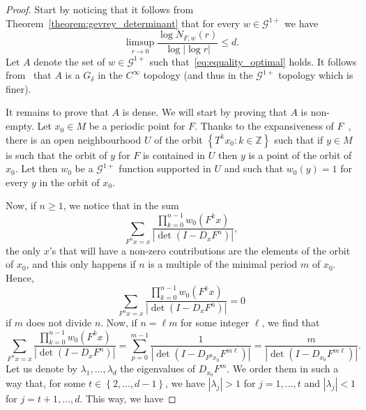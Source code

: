 \documentclass[10pt]{amsart}
\theoremstyle{definition}\newtheorem{defi}[theo]{Definition}\newtheorem{rema}[theo]{Remark}\newtheorem{exam}[theo]{Example}\newtheorem{exem}[theo]{Example}\newtheorem{nota}[theo]{Notation}
\newcommand{\set}[1]{\left\{ #1 \right\}}
\newcommand{\p}[1]{\left(#1\right)}
\newcommand{\va}[1]{\left|#1\right|}
\newcommand{\clG}{\mathcal{G}}
\newcommand{\bbZ}{\mathbb{Z}}
\begin{document}
\begin{proof}
Start by noticing that it follows from Theorem~\ref{theorem:gevrey_determinant} that for every $w \in \clG^{1+}$ we have
\begin{equation*}
\limsup_{r \to 0} \frac{\log N_{F,w}(r)}{\log \va{\log r}} \leq d.
\end{equation*}
Let $A$ denote the set of $w \in \clG^{1+}$ such that~\eqref{eq:equality_optimal} holds. It follows from~\cite[Theorem~2.7]{gouezel_liverani_1} that $A$ is a $G_\delta$ in the $C^\infty$ topology (and thus in the $\clG^{1+}$ topology which is finer).

It remains to prove that $A$ is dense. We will start by proving that $A$ is non-empty. Let $x_0 \in M$ be a periodic point for $F$. Thanks to the expansiveness of $F$~\cite[Corollary~6.4.10]{katok_hasselblatt}, there is an open neighbourhood $U$ of the orbit $\set{T^k x_0: k \in \bbZ}$ such that if $y \in M$ is such that the orbit of $y$ for $F$ is contained in $U$ then $y$ is a point of the orbit of $x_0$. Let then $w_0$ be a $\clG^{1+}$ function supported in $U$ and such that $w_0(y) = 1$ for every $y$ in the orbit of $x_0$.

Now, if $n \geq 1$, we notice that in the sum
\begin{equation*}
\sum_{F^n x = x} \frac{\prod_{k = 0}^{n-1} w_0\left(F^k x\right)}{\va{\det\p{ I - D_x F^n}}},
\end{equation*}
the only $x$'s that will have a non-zero contributions are the elements of the orbit of $x_0$, and this only happens if $n$ is a multiple of the minimal period $m$ of $x_0$. Hence,
\begin{equation*}
\sum_{F^n x = x} \frac{\prod_{k = 0}^{n-1} w_0\left(F^k x\right)}{\va{\det\p{ I - D_x F^n}}} = 0
\end{equation*}
if $m$ does not divide $n$. Now, if $n = \ell m$ for some integer $\ell$, we find that
\begin{equation*}
\sum_{F^n x = x} \frac{\prod_{k = 0}^{n-1} w_0\left(F^k x\right)}{\va{\det\p{ I - D_x F^n}}} = \sum_{p = 0}^{m-1} \frac{1}{\va{\det\p{I - D_{F^p x_0} F^{m \ell}}}} = \frac{m}{\va{\det\p{I - D_{x_0} F^{m \ell}}}}.
\end{equation*}
Let us denote by $\lambda_1, \dots, \lambda_d$ the eigenvalues of $D_{x_0} F^m$. We order them in such a way that, for some $t \in \set{2, \dots, d-1}$, we have $\va{\lambda_j} > 1$ for $j = 1, \dots, t$ and $\va{\lambda_j} < 1$ for $j = t+1, \dots, d$. This way, we have


\end{proof}
\end{document}
